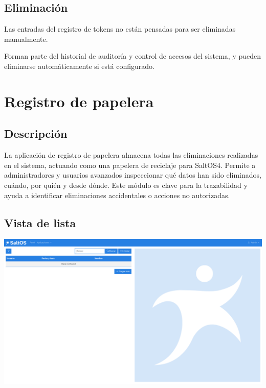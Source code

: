 \documentclass[a4paper]{article}
\begin{document}
\hypertarget{toc30}{}
\subsection{Eliminación}

Las entradas del registro de tokens no están pensadas para ser eliminadas manualmente.

Forman parte del historial de auditoría y control de accesos del sistema, y pueden eliminarse automáticamente si está configurado.


\hypertarget{toc31}{}
\section{Registro de papelera}

\hypertarget{toc32}{}
\subsection{Descripción}

La aplicación de registro de papelera almacena todas las eliminaciones realizadas en el sistema, actuando como una papelera de reciclaje para SaltOS4.
Permite a administradores y usuarios avanzados inspeccionar qué datos han sido eliminados, cuándo, por quién y desde dónde.
Este módulo es clave para la trazabilidad y ayuda a identificar eliminaciones accidentales o acciones no autorizadas.

\hypertarget{toc33}{}
\subsection{Vista de lista}

\begin{center}\includegraphics[width=1\textwidth]{../ujest/snaps/test-screenshots-js-screenshots-common-trashlog-list-es-es-1-snap.png}\end{center}
\end{document}

